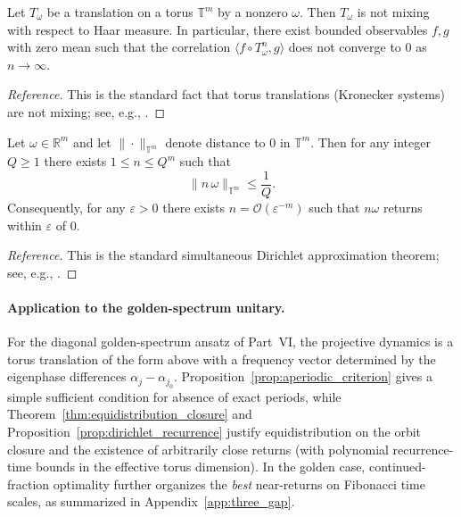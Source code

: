 \begin{proposition}
\label{prop:torus_not_mixing}
Let $T_\omega$ be a translation on a torus $\mathbb{T}^m$ by a nonzero $\omega$. Then $T_\omega$ is not mixing with respect to Haar measure. In particular, there exist bounded observables $f,g$ with zero mean such that the correlation $\langle f\circ T_\omega^n, g\rangle$ does not converge to $0$ as $n\to\infty$.
\end{proposition}
\begin{proof}[Reference]
This is the standard fact that torus translations (Kronecker systems) are not mixing; see, e.g., \cite{Walters1982}.
\end{proof}

\begin{proposition}
\label{prop:dirichlet_recurrence}
Let $\omega\in\mathbb{R}^m$ and let $\|\cdot\|_{\mathbb{T}^m}$ denote distance to $0$ in $\mathbb{T}^m$. Then for any integer $Q\ge 1$ there exists $1\le n\le Q^m$ such that
\begin{equation}
    \|n\,\omega\|_{\mathbb{T}^m} \le \frac{1}{Q}.
\end{equation}
Consequently, for any $\varepsilon>0$ there exists $n=\mathcal{O}(\varepsilon^{-m})$ such that $n\omega$ returns within $\varepsilon$ of $0$.
\end{proposition}
\begin{proof}[Reference]
This is the standard simultaneous Dirichlet approximation theorem; see, e.g., \cite{KuipersNiederreiter1974}.
\end{proof}

\paragraph{Application to the golden-spectrum unitary.}
For the diagonal golden-spectrum ansatz of Part~VI, the projective dynamics is a torus translation of the form above with a frequency vector determined by the eigenphase differences $\alpha_j-\alpha_{j_0}$. Proposition~\ref{prop:aperiodic_criterion} gives a simple sufficient condition for absence of exact periods, while Theorem~\ref{thm:equidistribution_closure} and Proposition~\ref{prop:dirichlet_recurrence} justify equidistribution on the orbit closure and the existence of arbitrarily close returns (with polynomial recurrence-time bounds in the effective torus dimension). In the golden case, continued-fraction optimality further organizes the \emph{best} near-returns on Fibonacci time scales, as summarized in Appendix~\ref{app:three_gap}.

